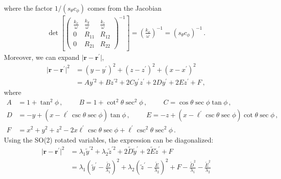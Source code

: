 \documentclass[a4paper,11pt]{article}
\begin{document}
%
where the factor $ 1/(s_{\theta} c_{\phi}) $ comes from the Jacobian
%
\begin{align}
   \det \left[ \begin{pmatrix}
        \frac{k_{x}}{\omega}  & \frac{k_{y}}{\omega} & \frac{k_{z}}{\omega} \\
        0 & R_{11} & R_{12} \\
        0  & R_{21} & R_{22}
    \end{pmatrix}^{-1} \right] = \left( \frac{k_{x}}{\omega} \right)^{-1} = \left( s_{\theta} c_{\phi} \right)^{-1} \,.
\end{align}
%
Moreover, we can expand $ \vert \bm{r} - \bm{r}^{\prime} \vert$,
%
\begin{align}
    \vert \bm{r} - \bm{r}^{\prime} \vert^{2} & = (y-y^{\prime})^{2} + (z-z^{\prime})^{2} + (x-x^{\prime})^{2} \nonumber \\
    & = A y^{\prime 2} + B z^{\prime 2} + 2 C y^{\prime} z^{\prime} + 2 D y^{\prime} + 2 E z^{\prime} + F \,,
\end{align}
%
where
%
\begin{equation}
    \begin{aligned}
    A & = 1 + \tan^{2} \phi \, , \hspace{1cm}
    B = 1 + \cot^{2} \theta \sec^{2} \phi \, , 
    \hspace{1cm}
    C = \cos \theta \sec \phi \tan \phi \,, \\
    D & = - y + ( x -  \ell^{\prime} \csc \theta \sec \phi ) \tan \phi \,, \hspace{1cm}
    E  = - z + ( x -  \ell^{\prime} \csc \theta \sec \phi ) \cot \theta \sec \phi \, , \\
    F & = x^{2} + y^{2} + z^{2} - 2 x  \ell^{\prime} \csc \theta \sec \phi + \ell^{\prime} \csc^{2} \theta \sec^{2} \phi  \,.
    \end{aligned}
\end{equation}
%
Using the SO(2) rotated variables, the expression can be diagonalized:
%
\begin{equation}
    \begin{aligned}
       \vert \bm{r} - \bm{r}^{\prime} \vert^{2}    & = \lambda_{1} \tilde{y}^{\prime 2} + \lambda_{2} \tilde{z}^{\prime 2} + 2 \tilde{D} \tilde{y}^{\prime} + 2 \tilde{E} \tilde{z}^{\prime} + F \\
       & = \lambda_{1} \left( \tilde{y}^{\prime} - \frac{\tilde{D}}{\lambda_{1}} \right)^{2} + \lambda_{2}  \left( \tilde{z}^{\prime} - \frac{\tilde{E}}{\lambda_{2}} \right)^{2} + F - \frac{\tilde{D}^{2}}{ \lambda_{1}} - \frac{\tilde{E}^{2}}{ \lambda_{2}}
\end{aligned}
\end{equation}
\end{document}
